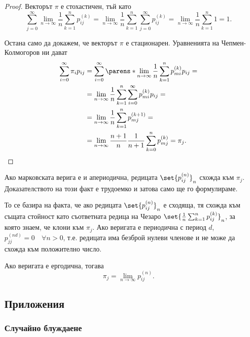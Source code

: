 \documentclass{../../common/topic}
\begin{document}
\begin{proof}
  Векторът \( \pi \) е стохастичен, тъй като
  \begin{equation*}
    \sum_{j=0}^\infty \lim_{n \to \infty} \frac 1 n \sum_{k=1}^n p_{ij}^{(k)}
    =
    \lim_{n \to \infty} \frac 1 n \sum_{k=1}^n \sum_{j=0}^\infty p_{ij}^{(k)}
    =
    \lim_{n \to \infty} \frac 1 n \sum_{k=1}^n 1
    =
    1.
  \end{equation*}

  Остана само да докажем, че векторът \( \pi \) е стационарен. Уравненията на Чепмен-Колмогоров ни дават
  \begin{align*}
    \sum_{i=0}^\infty \pi_i p_{ij}
    &=
    \sum_{i=0}^\infty \parens*{ \lim_{n \to \infty} \frac 1 n \sum_{k=1}^n p_{mi}^{(k)} } p_{ij}
    = \\ &=
    \lim_{n \to \infty} \frac 1 n \sum_{k=1}^n \sum_{i=0}^\infty p_{mi}^{(k)} p_{ij}
    = \\ &=
    \lim_{n \to \infty} \frac 1 n \sum_{k=1}^n p_{mj}^{(k+1)}
    = \\ &=
    \lim_{n \to \infty} \frac {n+1} n \frac 1 {n+1} \sum_{k=0}^n p_{mj}^{(k)}
    =
    \pi_j.
  \end{align*}
\end{proof}

Ако марковската верига е и апериодична, редицата \( {\set{ p_{ij}^{(n)} }}_n \) схожда към \( \pi_j \). Доказателството на този факт е трудоемко и затова само ще го формулираме.

То се базира на факта, че ако редицата \( {\set{ p_{ij}^{(n)} }}_n \) е сходяща, тя схожда към същата стойност като съответната редица на Чезаро \( {\set{ \frac 1 n \sum_{k=1}^n p_{ij}^{(k)} }}_n \), за която знаем, че клони към \( \pi_j \). Ако веригата е периодична с период \( d \), \( p_{jj}^{(nd)} = 0\quad\forall n > 0 \), т.е. редицата има безброй нулеви членове и не може да схожда към положително число.

\begin{corollary}
  Ако веригата е ергодична, тогава
  \begin{equation*}
    \pi_j = \lim_{n \to \infty} p_{ij}^{(n)}.
  \end{equation*}
\end{corollary}

\subsection{Приложения}

\subsubsection{Случайно блуждаене}
\end{document}
